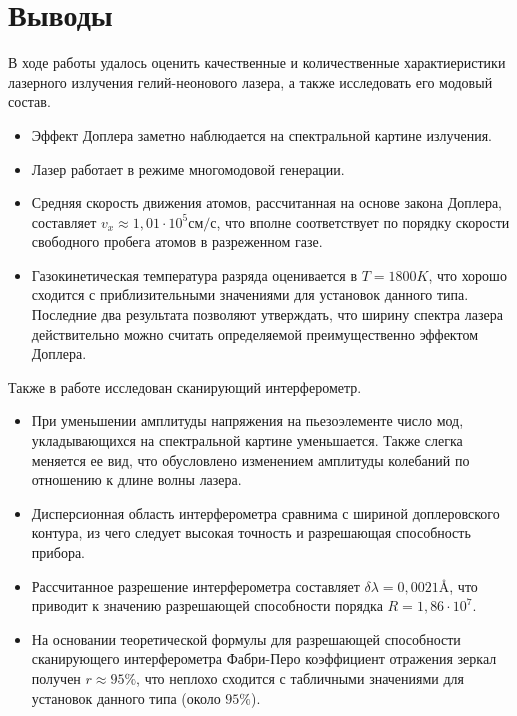 \section{Выводы}
В ходе работы удалось оценить качественные и количественные характиеристики лазерного излучения гелий-неонового лазера, а также исследовать его модовый состав. 
\begin{itemize}
    \item Эффект Доплера заметно наблюдается на спектральной картине излучения.
    \item Лазер работает в режиме многомодовой генерации.
    \item Средняя скорость движения атомов, рассчитанная на основе закона Доплера, составляет $v_x \approx 1,01 \cdot 10^5 \text{см/с}$, что вполне соответствует по порядку скорости свободного пробега атомов в разреженном газе.
    \item Газокинетическая температура разряда оценивается в $T = 1800K$, что хорошо сходится с приблизительными значениями для установок данного типа. Последние два результата позволяют утверждать, что ширину спектра лазера действительно можно считать определяемой преимущественно эффектом Доплера.
\end{itemize}
Также в работе исследован сканирующий интерферометр. 
\begin{itemize}
    \item При уменьшении амплитуды напряжения на пьезоэлементе число мод, укладывающихся на спектральной картине уменьшается. Также слегка меняется ее вид, что обусловлено изменением амплитуды колебаний по отношению к длине волны лазера.
    \item Дисперсионная область интерферометра сравнима с шириной доплеровского контура, из чего следует высокая точность и разрешающая способность прибора. 
    \item Рассчитанное разрешение интерферометра составляет $\delta \lambda = 0,0021 \si{\angstrom}$, что приводит к значению разрешающей способности порядка $R = 1,86 \cdot 10^7$. 
    \item На основании теоретической формулы для разрешающей способности сканирующего интерферометра Фабри-Перо коэффициент отражения зеркал получен $r \approx 95\%$, что неплохо сходится с табличными значениями для установок данного типа (около $95\%$).
\end{itemize}